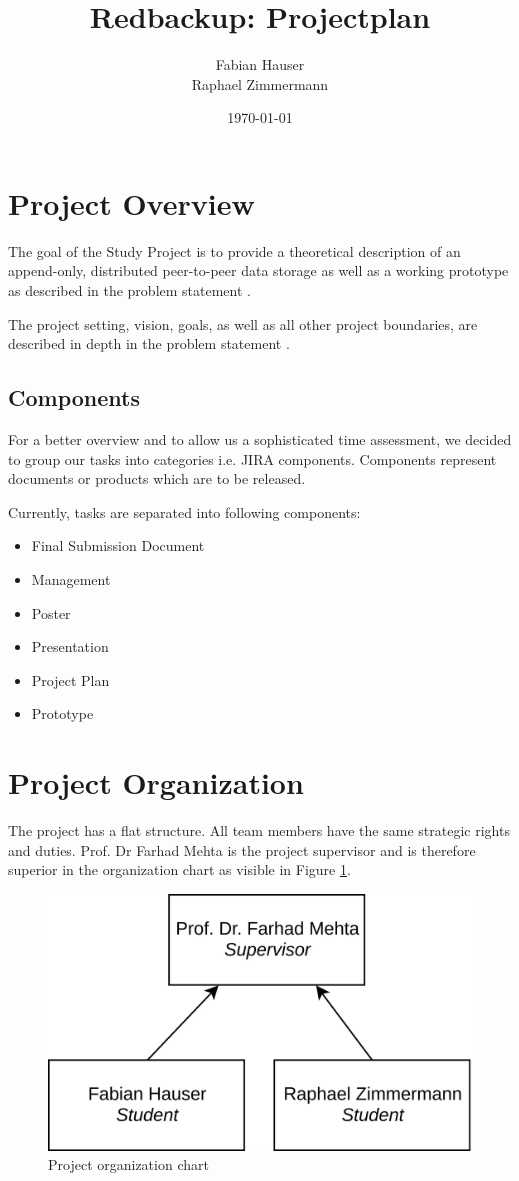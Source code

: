 \documentclass[a4paper]{article}
\title{Redbackup: Projectplan}
\author{
		Fabian Hauser \\
		Raphael Zimmermann
}
\date{\today}
\begin{document}
\maketitle

\section{Project Overview}
The goal of the Study Project is to provide a theoretical description of an append-only, distributed peer-to-peer data storage as well as a working prototype as described in the problem statement \cite{problemstatement}.

The project setting, vision, goals, as well as all other project boundaries, are described in depth in the problem statement \cite{problemstatement}.

\subsection{Components}

For a better overview and to allow us a sophisticated time assessment, we decided to group our tasks into categories i.e. JIRA components. Components represent documents or products which are to be released.

Currently, tasks are separated into following components:

\begin{multicols}{2}
	\begin{itemize}
		\item Final Submission Document
		\item Management
		\item Poster
		\item Presentation
		\item Project Plan
		\item Prototype
	\end{itemize}
\end{multicols}

\section{Project Organization}

The project has a flat structure. All team members have the same strategic rights and duties. Prof. Dr Farhad Mehta is the project supervisor and is therefore superior in the organization chart as visible in Figure \ref{fig:organigram}.

\begin{figure}[H]
	\centering
	\includegraphics[width=0.5\linewidth]{resources/organigram}
	\caption[Organigram]{Project organization chart}
	\label{fig:organigram}
\end{figure}
\end{document}
